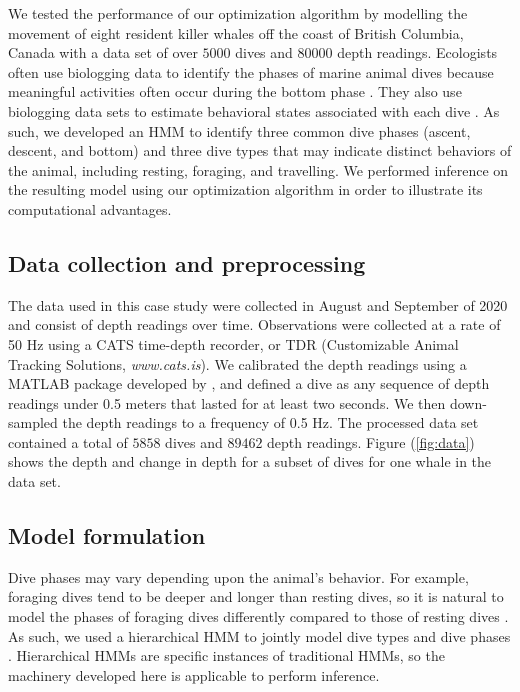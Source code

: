 We tested the performance of our optimization algorithm by modelling the movement of eight resident killer whales off the coast of British Columbia, Canada with a data set of over $5000$ dives and $80000$ depth readings. Ecologists often use biologging data to identify the phases of marine animal dives because meaningful activities often occur during the bottom phase \citep[e.g. searching and hunting for prey,][]{Wright:2017,Jensen:2023}. They also use biologging data sets to estimate behavioral states associated with each dive \citep[e.g. foraging, resting, and travelling,][]{Tennessen:2023}. As such, we developed an HMM to identify three common dive phases (ascent, descent, and bottom) and three dive types that may indicate distinct behaviors of the animal, including resting, foraging, and travelling. We performed inference on the resulting model using our optimization algorithm in order to illustrate its computational advantages.

\subsection{Data collection and preprocessing}

The data used in this case study were collected in August and September of 2020 and consist of depth readings over time. Observations were collected at a rate of 50 Hz using a CATS time-depth recorder, or TDR (Customizable Animal Tracking Solutions, {\em{www.cats.is}}). We calibrated the depth readings using a MATLAB package developed by \citet{Cade:2021}, and defined a dive as any sequence of depth readings under 0.5 meters that lasted for at least two seconds. We then down-sampled the depth readings to a frequency of 0.5 Hz. The processed data set contained a total of $5858$ dives and $89462$ depth readings. Figure (\ref{fig:data}) shows the depth and change in depth for a subset of dives for one whale in the data set. 

\subsection{Model formulation}

Dive phases may vary depending upon the animal's behavior. For example, foraging dives tend to be deeper and longer than resting dives, so it is natural to model the phases of foraging dives differently compared to those of resting dives \citep{Tennessen:2019b}. As such, we used a hierarchical HMM to jointly model dive types and dive phases \citep{Barajas:2017}. Hierarchical HMMs are specific instances of traditional HMMs, so the machinery developed here is applicable to perform inference. 

